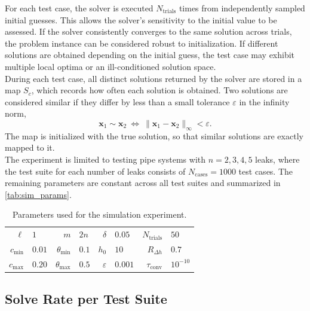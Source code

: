 For each test case, the solver is executed $N_{\mathrm{trials}}$ times from independently sampled initial guesses. This allows the solver's sensitivity to the initial value to be assessed. If the solver consistently converges to the same solution across trials, the problem instance can be considered robust to initialization. If different solutions are obtained depending on the initial guess, the test case may exhibit multiple local optima or an ill-conditioned solution space.\\

\newpage
During each test case, all distinct solutions returned by the solver are stored in a map $S_c$, which records how often each solution is obtained.  Two solutions are considered similar if they differ by less than a small tolerance $\varepsilon$ in the infinity norm,
\begin{equation*}
\mathbf{x}_1 \sim \mathbf{x}_2
\ \Leftrightarrow \ 
\|\mathbf{x}_1 - \mathbf{x}_2\|_\infty < \varepsilon.
\end{equation*}
The map is initialized with the true solution, so that similar solutions are exactly mapped to it.\\

The experiment is limited to testing pipe systems with $ n=2, 3, 4, 5$ leaks, where the test suite for each number of leaks consists of $N_\text{cases}=1000$ test cases. The remaining parameters are constant across all test suites and summarized in \autoref{tab:sim_params}.

\begin{table}[ht]
\centering
\setlength{\tabcolsep}{8pt}      %
\renewcommand{\arraystretch}{1.3} %
\begin{tabular}{
r@{\,$=$\,}l
r@{\,$=$\,}l
r@{\,$=$\,}l
r@{\,$=$\,}l
}
$\ell$ & $1$ &
$m$ & $2n$ &
$\delta$ & $0.05$ &
$N_\text{trials}$ & $50$\\

$c_{\min}$ & $0.01$ &
$\theta_{\min}$ & $0.1$ &
$h_0$ & $10$ &
$R_{\Delta h}$ & $0.7$ \\

$c_{\max}$ & $0.20$ &
$\theta_{\max}$ & $0.5$ &
$\varepsilon$ & $0.001$ &
$\tau_\text{conv}$ & $10^{-10}$
\end{tabular}
\caption{Parameters used for the simulation experiment.}
\label{tab:sim_params}
\end{table}

\subsection{Solve Rate per Test Suite}

